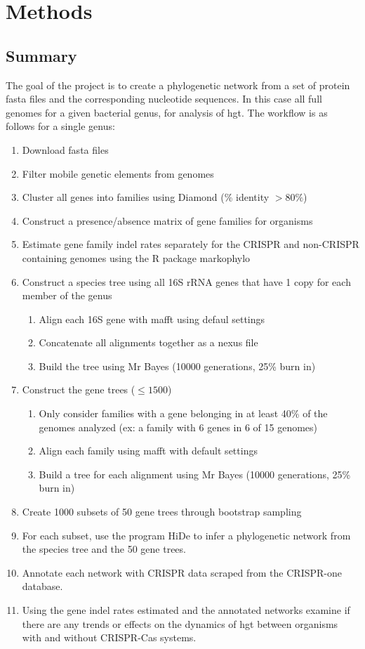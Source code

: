 \section*{\huge Methods}
\subsection*{Summary}
The goal of the project is to create a phylogenetic network from a set of protein fasta files and the corresponding nucleotide sequences.
In this case all full genomes for a given bacterial genus, for analysis of \ac{hgt}.
The workflow is as follows for a single genus:
\begin{enumerate}
    \item Download fasta files
    \item Filter mobile genetic elements from genomes
    \item Cluster all genes into families using Diamond (\% identity $> 80\%$)
    \item Construct a presence/absence matrix of gene families for organisms
    \item Estimate gene family indel rates separately for the CRISPR and non-CRISPR containing genomes using the R package markophylo
    \item Construct a species tree using all 16S rRNA genes that have 1 copy for each member of the genus
    \begin{enumerate}
        \item Align each 16S gene with mafft using defaul settings
        \item Concatenate all alignments together as a nexus file
        \item Build the tree using Mr Bayes (10000 generations, 25\% burn in)
    \end{enumerate}
    \item Construct the gene trees ($\leq 1500$)
    \begin{enumerate}
        \item Only consider families with a gene belonging in at least 40\% of the genomes analyzed (ex: a family with 6 genes in 6 of 15 genomes)
        \item Align each family using mafft with default settings
        \item Build a tree for each alignment using Mr Bayes (10000 generations, 25\% burn in)
    \end{enumerate}
    \item Create 1000 subsets of 50 gene trees through bootstrap sampling
    \item For each subset, use the program HiDe to infer a phylogenetic network from the species tree and the 50 gene trees.
    \item Annotate each network with CRISPR data scraped from the CRISPR-one database.
    \item Using the gene indel rates estimated and the annotated networks examine if there are any trends or effects on the dynamics of \ac{hgt} between organisms with and without CRISPR-Cas systems.
\end{enumerate}
